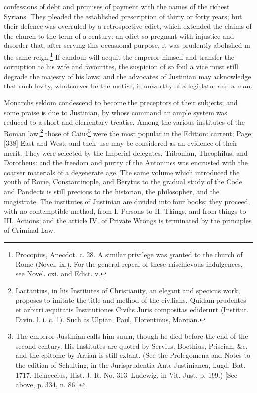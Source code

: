 confessions of debt and promises of payment with the names of the richest Syrians. They pleaded the established prescription of thirty or forty years; but their defence was overruled by a retrospective edict, which extended the claims of the church to the term of a century: an edict so pregnant with injustice and disorder that, after serving this occasional purpose, it was prudently abolished in the same reign.\footnote{Procopius, Anecdot. c. 28. A similar privilege was granted to the church of Rome (Novel. ix.). For the general repeal of these mischievous indulgences, see Novel. cxi. and Edict. v.} If candour will acquit the emperor himself and transfer the corruption to his wife and favourites, the suspicion of so foul a vice must still degrade the majesty of his laws; and the advocates of Justinian may acknowledge that such levity, whatsoever be the motive, is unworthy of a legislator and a man.

Monarchs seldom condescend to become the preceptors of their subjects; and some praise is due to Justinian, by whose command an ample system was reduced to a short and elementary treatise. Among the various institutes of the Roman law,\footnote{Lactantius, in his Institutes of Christianity, an elegant and specious work, proposes to imitate the title and method of the civilians. Quidam prudentes et arbitri æquitatis Institutiones Civilis Juris compositas ediderunt (Institut. Divin. l. i. c. 1). Such as Ulpian, Paul, Florentinus, Marcian.} those of Caius\footnote{The emperor Justinian calls him suum, though he died before the end of the second century. His Institutes are quoted by Servius, Boethius, Priscian, \&c. and the epitome by Arrian is still extant. (See the Prolegomena and Notes to the edition of Schulting, in the Jurisprudentia Ante-Justinianea, Lugd. Bat. 1717. Heineccius, Hist. J. R. No. 313. Ludewig, in Vit. Just. p. 199.) [See above, p. 334, n. 86.]} were the most popular in the Edition: current; Page: [338] East and West; and their use may be considered as an evidence of their merit. They were selected by the Imperial delegates, Tribonian, Theophilus, and Dorotheus: and the freedom and purity of the Antonines was encrusted with the coarser materials of a degenerate age. The same volume which introduced the youth of Rome, Constantinople, and Berytus to the gradual study of the Code and Pandects is still precious to the historian, the philosopher, and the magistrate. The institutes of Justinian are divided into four books; they proceed, with no contemptible method, from I. Persons to II. Things, and from things to III. Actions; and the article IV. of Private Wrongs is terminated by the principles of Criminal Law.


